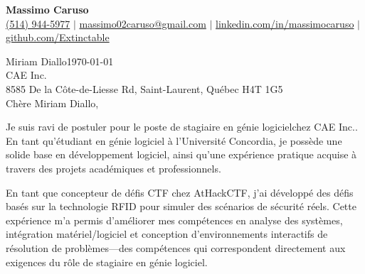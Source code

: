 \documentclass[10pt]{article}
\begin{document}
\newcommand{\fullname}{Massimo Caruso}
\newcommand{\phone}{(514) 944-5977}
\newcommand{\email}{massimo02caruso@gmail.com}
\newcommand{\linkedin}{linkedin.com/in/massimocaruso}
\newcommand{\github}{github.com/Extinctable}

\newcommand*{\hiringManager}{Miriam Diallo}
\newcommand*{\company}{CAE Inc.}
\newcommand*{\address}{8585 De la Côte-de-Liesse Rd, Saint-Laurent, Québec H4T 1G5}

\newcommand*{\position}{stagiaire en génie logiciel}

\begin{center}
    {\Huge \textbf{\fullname}} \\
    \vspace{1mm}
    {\small 
    \faPhone \hspace{0mm} \href{tel:+15149445977}{\phone} $\vert$ 
    \faEnvelope \hspace{0mm} \href{mailto:massimo02caruso@gmail.com}{\email} $\vert$ 
    \faLinkedin \hspace{0mm} \href{https://linkedin.com/in/massimocaruso}{\linkedin} $\vert$ 
    \faGithub \hspace{0mm} \href{https://github.com/Extinctable}{\github}
    }
\end{center}

\vspace{1.5em}
\hiringManager \hfill \today \\
\company \\
\address \\

\vspace{1.5em}
Chère \hiringManager,

Je suis ravi de postuler pour le poste de \position \space chez \company. En tant qu'étudiant en génie logiciel à l'Université Concordia, je possède une solide base en développement logiciel, ainsi qu'une expérience pratique acquise à travers des projets académiques et professionnels.

En tant que concepteur de défis CTF chez AtHackCTF, j'ai développé des défis basés sur la technologie RFID pour simuler des scénarios de sécurité réels. Cette expérience m'a permis d'améliorer mes compétences en analyse des systèmes, intégration matériel/logiciel et conception d'environnements interactifs de résolution de problèmes—des compétences qui correspondent directement aux exigences du rôle de \position.
\end{document}
